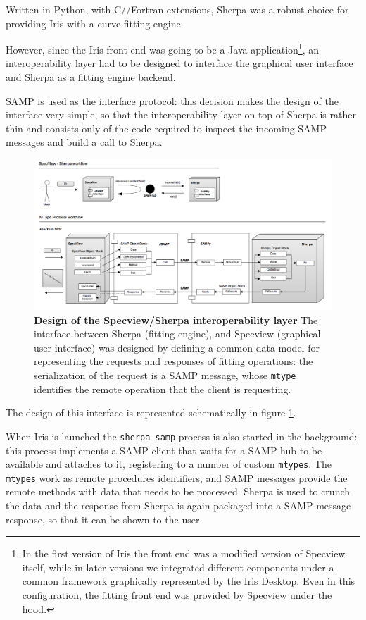 \documentclass[final,5p]{elsarticle}
\begin{document}
Written in Python, with C/\Cpp/Fortran extensions, Sherpa was a robust choice for providing Iris with a curve fitting engine.

However, since the Iris front end was going to be a Java application\footnote{In the first version of Iris the front end was a modified version of Specview itself, while in later versions we integrated different components under a common framework graphically represented by the Iris Desktop. Even in this configuration, the fitting front end was provided by Specview under the hood.}, an interoperability layer had to be designed to interface the graphical user interface and Sherpa as a fitting engine backend.

SAMP is used as the interface protocol: this decision makes the design of the interface very simple, so that the interoperability layer on top of Sherpa is rather thin and consists only of the code required to inspect the incoming SAMP messages and build a call to Sherpa.

\begin{figure}
\begin{center}
\includegraphics[width=\columnwidth]{figures/sherpasamp.png}
\caption{\textbf{Design of the Specview/Sherpa interoperability layer} The interface between Sherpa (fitting engine), and Specview (graphical user interface) was designed by defining a common data model for representing the requests and responses of fitting operations: the serialization of the request is a SAMP message, whose \texttt{mtype} identifies the remote operation that the client is requesting.}
\label{fig:sherpasamp}
\end{center}
\end{figure}

The design of this interface is represented schematically in figure \ref{fig:sherpasamp}.

When Iris is launched the \verb|sherpa-samp| process is also started in the background: this process implements a SAMP client that waits for a SAMP hub to be available and attaches to it, registering to a number of custom \verb|mtypes|. The \verb|mtypes| work as remote procedures identifiers, and SAMP messages provide the remote methods with data that needs to be processed. Sherpa is used to crunch the data and the response from Sherpa is again packaged into a SAMP message response, so that it can be shown to the user.
\end{document}
